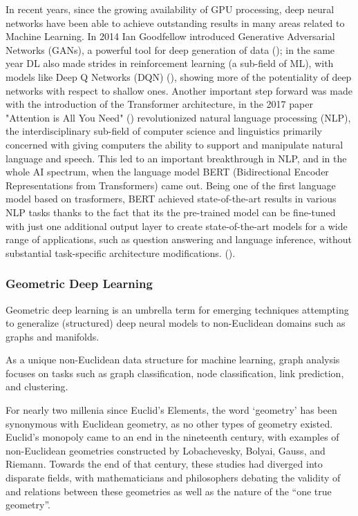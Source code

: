 \documentclass[binding=0.6cm]{sapthesis}
\newcommand{\mycite}[1]{(\cite{#1})}
\begin{document}
In recent years, since the growing availability of GPU processing, deep neural networks have been able to achieve outstanding results in many areas related to Machine Learning. In 2014 Ian Goodfellow introduced Generative Adversarial Networks (GANs), a powerful tool for deep generation of data \mycite{goodfellow2014-GANs}; in the same year DL also made strides in reinforcement learning (a sub-field of ML), with models like Deep Q Networks (DQN) \mycite{Mnih2015-HumanlevelCT}, showing more of the potentiality of deep networks with respect to shallow ones. Another important step forward was made with the introduction of the Transformer architecture, in the 2017 paper "Attention is All You Need" \mycite{vaswani2017-attention} revolutionized natural language processing (NLP), the interdisciplinary sub-field of computer science and linguistics primarily concerned with giving computers the ability to support and manipulate natural language and speech. This led to an important breakthrough in NLP, and in the whole AI spectrum, when the language model BERT (Bidirectional Encoder Representations from Transformers) came out. Being one of the first language model based on trasformers, BERT achieved state-of-the-art results in various NLP tasks thanks to the fact that its the pre-trained model can be fine-tuned with just one additional output layer to create state-of-the-art models for a wide range of applications, such as question answering and language inference, without substantial task-specific architecture modifications.  \mycite{devlin2018-bert}.


\subsubsection{Geometric Deep Learning}
\label{sec:bg.gnn.geo-deep-learning}
Geometric deep learning is an umbrella term for emerging techniques attempting to generalize (structured) deep neural models to non-Euclidean domains such as graphs and manifolds. 

As a unique non-Euclidean data structure for machine learning, graph analysis focuses on tasks such as graph classification, node classification, link prediction, and clustering. 

For nearly two millenia since Euclid’s Elements, the word ‘geometry’ has been synonymous with Euclidean geometry, as no other types of geometry existed. Euclid’s monopoly came to an end in the nineteenth century, with examples of non-Euclidean geometries constructed by Lobachevesky, Bolyai, Gauss, and Riemann. Towards the end of that century, these studies had diverged into disparate fields, with mathematicians and philosophers debating the validity of and relations between these geometries as well as the nature of the “one true geometry”.
\end{document}
